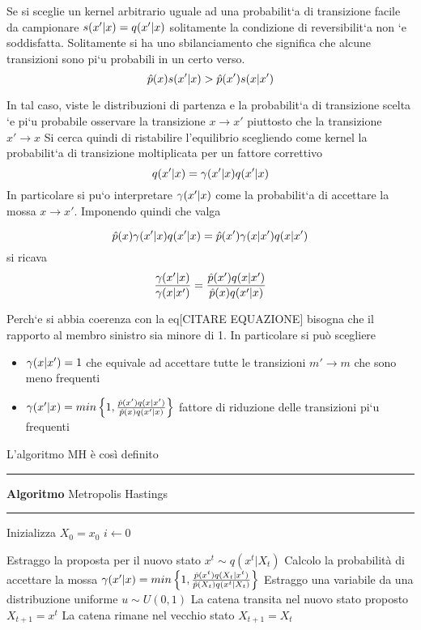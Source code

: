 Se si sceglie un kernel arbitrario uguale ad una probabilit`a di transizione facile
da campionare $s(x'|x) = q(x'|x) $ solitamente la condizione di reversibilit`a non `e
soddisfatta. Solitamente si ha uno sbilanciamento che significa che alcune transizioni
sono pi`u probabili in un certo verso.
\begin{equation}
\hat{p}(x)s(x'|x)>\hat{p}(x')s(x|x')
\end{equation}

In tal caso, viste le distribuzioni di partenza e la probabilit`a di transizione scelta `e
pi`u probabile osservare la transizione $x\rightarrow x'$ piuttosto che la transizione $x'\rightarrow x$
Si cerca quindi di ristabilire l’equilibrio scegliendo come kernel la probabilit`a di
transizione moltiplicata per un fattore correttivo 
\begin{equation}
q(x'|x) = \gamma(x'|x)q(x'|x)
\end{equation}
In particolare si pu`o interpretare $\gamma(x'|x)$ come la probabilit`a di accettare la mossa $x \rightarrow x'$. Imponendo quindi che valga


\begin{equation}
\hat{p}(x)\gamma(x'|x)q(x'|x)=\hat{p}(x')\gamma(x|x')q(x|x')
\end{equation}
si ricava
\begin{equation}
\frac{\gamma(x'|x)}{\gamma(x|x')}=\frac{\hat{p}(x')q(x|x')}{\hat{p}(x)q(x'|x)}
\end{equation}

Perch`e si abbia coerenza con la eq[CITARE EQUAZIONE] bisogna che il rapporto al membro sinistro sia minore di 1. In particolare si può scegliere

\begin{itemize}
\item $\gamma(x|x')=1$ che equivale ad accettare tutte le transizioni $m' \rightarrow m$ che sono meno
frequenti
\item $\gamma(x'|x)=min\left\lbrace 1,\frac{\hat{p}(x')q(x|x')}{\hat{p}(x)q(x'|x)}\right\rbrace$ fattore di riduzione delle transizioni pi`u frequenti
\end{itemize}
\newpage
 L'algoritmo MH è così definito\vspace{1em}\\
\hrule 
\textbf{Algoritmo} Metropolis Hastings
\hrule



\begin{algorithmic}
\State Inizializza  $X_0=x_0$
    \State $i\gets 0$

\State Estraggo la proposta per il nuovo stato $x^t \sim q(x^t |X_t)$
\State Calcolo la probabilità di accettare la mossa $\gamma(x'|x)=min\left\lbrace 1,\frac{\hat{p}(x^t)q(X_t | x^t)}{\hat{p}(X_t)q(x^t|X_t  )}\right\rbrace$
\State Estraggo una variabile da una distribuzione uniforme $u\sim U(0,1)$
 \State La catena transita nel nuovo stato proposto $X_{t+1}=x^t$
\Else
\State La catena rimane nel vecchio stato $X_{t+1}=X_t$
\EndIf
\EndFor
\end{algorithmic}

